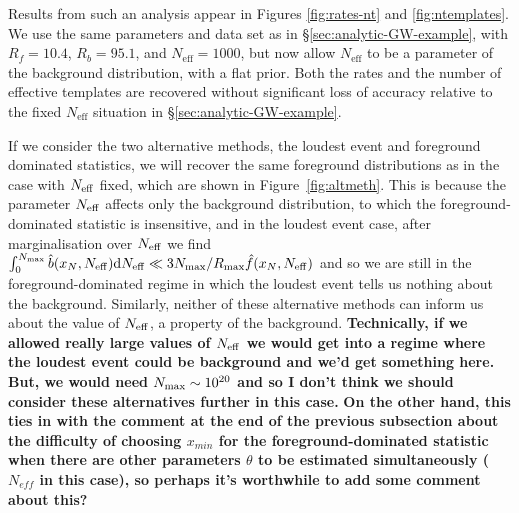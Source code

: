 \documentclass[aps,prd]{revtex4-1}
\newcommand{\ilya}[1]{{\color{red} \bf #1}}
\newcommand{\jon}[1]{{\color{green} \bf #1}}
\begin{document}
Results from such an analysis appear in Figures \ref{fig:rates-nt} and
\ref{fig:ntemplates}.  We use the same parameters and data set as in
\S \ref{sec:analytic-GW-example}, with $R_f = 10.4$, $R_b = 95.1$, and
$N_\mathrm{eff} = 1000$, but now allow $N_\mathrm{eff}$ to be a
parameter of the background distribution, with a flat prior.  Both the
rates and the number of effective templates are recovered without
significant loss of accuracy relative to the fixed $N_\mathrm{eff}$
situation in \S \ref{sec:analytic-GW-example}.

If we consider the two alternative methods, the loudest event and
foreground dominated statistics, we will recover the same foreground
distributions as in the case with $N_{\rm eff}$ fixed, which are shown
in Figure~\ref{fig:altmeth}. This is because the parameter $N_{\rm
  eff}$ affects only the background distribution, to which the
foreground-dominated statistic is insensitive, and in the loudest
event case, after marginalisation over $N_{\rm eff}$ we find
$\int_0^{N_{\rm max}} \hat{b}(x_N,N_{\rm eff}) {\rm d}N_{\rm eff} \ll
3 N_{\rm max}/R_{\rm max} \hat{f}(x_N, N_{\rm eff})$ and so we are
still in the foreground-dominated regime in which the loudest event
tells us nothing about the background. Similarly, neither of these
alternative methods can inform us about the value of $N_{\rm eff}$, a
property of the background. \jon{Technically, if we allowed really
  large values of $N_{\rm eff}$ we would get into a regime where the
  loudest event could be background and we'd get something here. But,
  we would need $N_{\rm max} \sim 10^{20}$ and so I don't think we
  should consider these alternatives further in this case.} \ilya{On
  the other hand, this ties in with the comment at the end of the
  previous subsection about the difficulty of choosing $x_{min}$ for
  the foreground-dominated statistic when there are other parameters
  $\theta$ to be estimated simultaneously ($N_{eff}$ in this case), so
  perhaps it's worthwhile to add some comment about this?}
\end{document}

